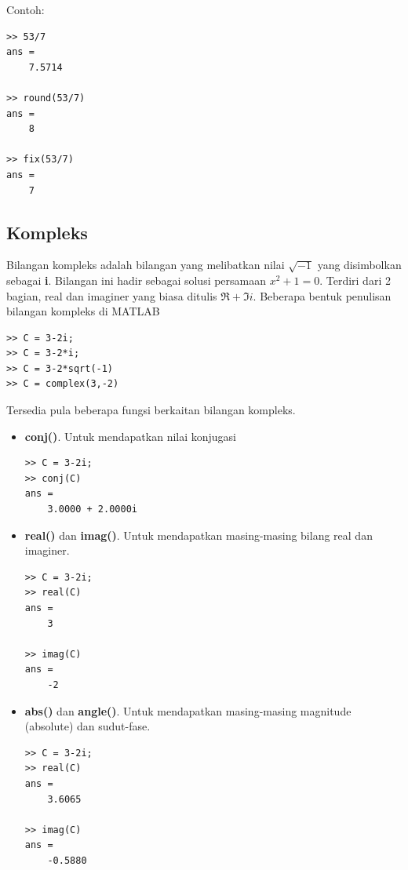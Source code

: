 \documentclass[12pt]{book}
\begin{document}
	Contoh:
	\begin{verbatim}
>> 53/7
ans = 
    7.5714

>> round(53/7)
ans = 
    8
    
>> fix(53/7)
ans = 
    7
	\end{verbatim}

	\subsection{Kompleks}
	
	Bilangan kompleks adalah bilangan yang melibatkan nilai $\sqrt{-1}$ yang disimbolkan sebagai \textbf{i}.
	Bilangan ini hadir sebagai solusi persamaan $x^{2}+1=0$.
	Terdiri dari 2 bagian, real dan imaginer yang biasa ditulis $\Re+\Im i$.
	Beberapa bentuk penulisan bilangan kompleks di MATLAB
	\begin{verbatim}
>> C = 3-2i;
>> C = 3-2*i;
>> C = 3-2*sqrt(-1)
>> C = complex(3,-2)
	\end{verbatim}

	Tersedia pula beberapa fungsi berkaitan bilangan kompleks.
	\begin{itemize}
		\item \textbf{conj()}. Untuk mendapatkan nilai konjugasi
		\begin{verbatim}
>> C = 3-2i;
>> conj(C)
ans = 
    3.0000 + 2.0000i
		\end{verbatim}
	
		\item \textbf{real()} dan \textbf{imag()}. Untuk mendapatkan masing-masing bilang real dan imaginer.
		\begin{verbatim}
>> C = 3-2i;
>> real(C)
ans = 
    3
   
>> imag(C)
ans = 
    -2
		\end{verbatim}
	
		\item \textbf{abs()} dan \textbf{angle()}. Untuk mendapatkan masing-masing magnitude (absolute) dan sudut-fase.
		\begin{verbatim}
>> C = 3-2i;
>> real(C)
ans = 
    3.6065

>> imag(C)
ans = 
    -0.5880
		\end{verbatim}
	\end{itemize}
\end{document}
